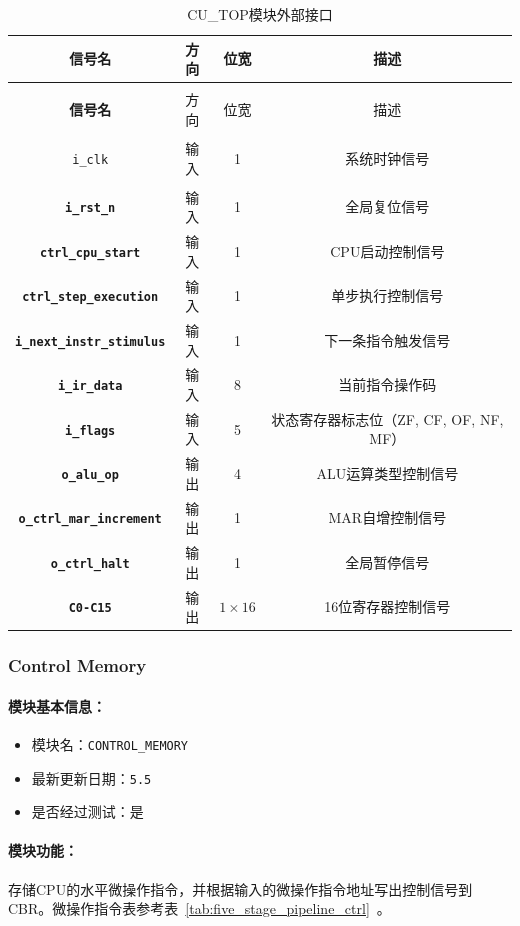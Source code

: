 \documentclass[lang=cn,a4paper,newtx]{elegantpaper}
\begin{document}
\begin{longtable}{>{\bfseries}c c c c}
  \caption{CU\_TOP模块外部接口} \\ 
  \toprule
  信号名 & 方向 & 位宽 & 描述 \\ 
  \midrule
  \endfirsthead

  \multicolumn{4}{l}{\textbf{（续表）CU\_TOP模块外部接口}} \\ 
  \toprule
  信号名 & 方向 & 位宽 & 描述 \\ 
  \midrule
  \endhead

  \texttt{i\_clk} & 输入 & 1 & 系统时钟信号 \\ 
  \texttt{i\_rst\_n} & 输入 & 1 & 全局复位信号 \\ 
  \texttt{ctrl\_cpu\_start} & 输入 & 1 & CPU启动控制信号 \\ 
  \texttt{ctrl\_step\_execution} & 输入 & 1 & 单步执行控制信号 \\ 
  \texttt{i\_next\_instr\_stimulus} & 输入 & 1 & 下一条指令触发信号 \\ 
  \texttt{i\_ir\_data} & 输入 & 8 & 当前指令操作码 \\ 
  \texttt{i\_flags} & 输入 & 5 & 状态寄存器标志位（ZF, CF, OF, NF, MF） \\ 
  \texttt{o\_alu\_op} & 输出 & 4 & ALU运算类型控制信号 \\ 
  \texttt{o\_ctrl\_mar\_increment} & 输出 & 1 & MAR自增控制信号 \\ 
  \texttt{o\_ctrl\_halt} & 输出 & 1 & 全局暂停信号 \\ 
  \texttt{C0-C15} & 输出 & $1\times 16$ & 16位寄存器控制信号 \\ 
  \bottomrule
\end{longtable}

\subsubsection{Control Memory}\label{sec:ControlMemory}
\paragraph{模块基本信息：}
\begin{itemize}
  \item 模块名：\texttt{CONTROL\_MEMORY}
  \item 最新更新日期：\texttt{5.5}
  \item 是否经过测试：是
\end{itemize}
\paragraph{模块功能：}
存储CPU的水平微操作指令，并根据输入的微操作指令地址写出控制信号到CBR。微操作指令表参考表~\ref{tab:five_stage_pipeline_ctrl}~。
\end{document}
